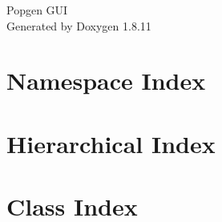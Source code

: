 \documentclass[twoside]{book}
\newcommand{\+}{\discretionary{\mbox{\scriptsize$\hookleftarrow$}}{}{}}
\newcommand{\clearemptydoublepage}{%
  \newpage{\pagestyle{empty}\cleardoublepage}%
}
\begin{document}
\hypersetup{pageanchor=false,
             bookmarksnumbered=true,
             pdfencoding=unicode
            }
\begin{titlepage}
\vspace*{7cm}
\begin{center}%
{\Large Popgen G\+UI }\\
\vspace*{1cm}
{\large Generated by Doxygen 1.8.11}\\
\end{center}
\end{titlepage}
\clearemptydoublepage
\tableofcontents
\clearemptydoublepage
{}
\hypersetup{pageanchor=true}

\chapter{Namespace Index}

\chapter{Hierarchical Index}

\chapter{Class Index}

\end{document}
